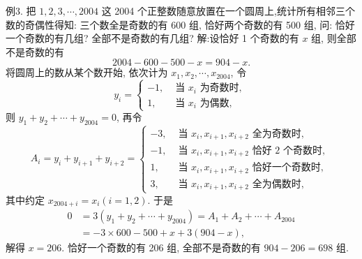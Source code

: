 例3. 把 $1,2,3, \cdots, 2004$ 这 2004 个正整数随意放置在一个圆周上,统计所有相邻三个数的奇偶性得知: 三个数全是奇数的有 600 组, 恰好两个奇数的有 500 组, 问: 恰好一个奇数的有几组? 全部不是奇数的有几组?
解:设恰好 1 个奇数的有 $x$ 组, 则全部不是奇数的有
$$
2004-600-500-x=904-x .
$$
将圆周上的数从某个数开始, 依次计为 $x_1, x_2, \cdots, x_{2004}$, 令
$$
y_i= \begin{cases}-1, & \text { 当 } x_i \text { 为奇数时, } \\ 1, & \text { 当 } x_i \text { 为偶数, }\end{cases}
$$
则 $y_1+y_2+\cdots+y_{2004}=0$, 再令
$$
A_i=y_i+y_{i+1}+y_{i+2}= \begin{cases}-3, & \text { 当 } x_i, x_{i+1}, x_{i+2} \text { 全为奇数时, } \\ -1, & \text { 当 } x_i, x_{i+1}, x_{i+2} \text { 恰好 } 2 \text { 个奇数时, } \\ 1, & \text { 当 } x_i, x_{i+1}, x_{i+2} \text { 恰好一个奇数时, } \\ 3, & \text { 当 } x_i, x_{i+1}, x_{i+2} \text { 全为偶数时, }\end{cases}
$$
其中约定 $x_{2004+i}=x_i(i=1,2)$. 于是
$$
\begin{aligned}
0 & =3\left(y_1+y_2+\cdots+y_{2004}\right)=A_1+A_2+\cdots+A_{2004} \\
& =-3 \times 600-500+x+3(904-x),
\end{aligned}
$$
解得 $x=206$.
恰好一个奇数的有 206 组, 全部不是奇数的有 $904-206=698$ 组.



